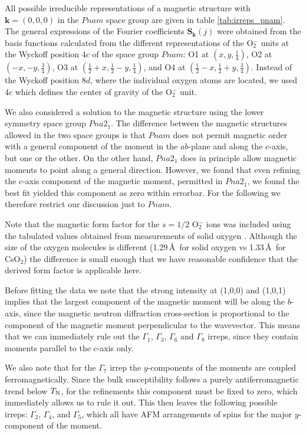 \documentclass[prb,aps,twocolumn,superscriptaddress,showpacs,footinbib]{revtex4-2}
\begin{document}
All possible irreducible representations of a magnetic structure with $\mathbf{k}=(0,0,0)$ in the $Pnam$ space group are given in table \ref{tab:irreps_pnam}. The general expressions of the Fourier coefficients $\mathbf{S_{k}}(j)$ were obtained from the basis functions calculated from the different representations of the O$_{2}^{-}$ units at the Wyckoff position $4c$ of the space group $Pnam$: O1 at $(x,y,\frac{1}{4})$, O2 at $(-x,-y,\frac{3}{4})$, O3 at $(\frac{1}{2}+x,\frac{1}{2}-y,\frac{1}{4})$, and O4 at $(\frac{1}{2}-x,\frac{1}{2}+y,\frac{3}{4})$. Instead of the Wyckoff position $8d$, where the individual oxygen atoms are located, we used $4c$ which defines the center of gravity of the O$_{2}^{-}$ unit.

We also considered a solution to the magnetic structure using the lower symmetry space group $Pna2_{1}$. The difference between the magnetic structures allowed in the two space groups is that $Pnam$ does not permit magnetic order with a general component of the moment in the $ab$-plane and along the $c$-axis, but one or the other. On the other hand, $Pna2_{1}$ does in principle allow magnetic moments to point along a general direction. However, we found that even refining the $c$-axis component of the magnetic moment, permitted in $Pna2_{1}$, we found the best fit yielded this component as zero within errorbar. For the following we therefore restrict our discussion just to $Pnam$.

Note that the magnetic form factor for the $s=1/2$ O$_{2}^{-}$ ions was included using the tabulated values obtained from measurements of solid oxygen \cite{Stephens_FF}. Although the size of the oxygen molecules is different (1.29\,\AA\, for solid oxygen vs 1.33\,\AA\, for CsO$_{2}$) the difference is small enough that we have reasonable confidence that the derived form factor is applicable here.

Before fitting the data we note that the strong intensity at (1,0,0) and (1,0,1) implies that the largest component of the magnetic moment will be along the $b$-axis, since the magnetic neutron diffraction cross-section is proportional to the component of the magnetic moment perpendicular to the wavevector. This means that we can immediately rule out the $\Gamma_{1}$, $\Gamma_{3}$, $\Gamma_{6}$ and $\Gamma_{8}$ irreps, since they contain moments parallel to the $c$-axis only.

We also note that for the $\Gamma_{7}$ irrep the $y$-components of the moments are coupled ferromagnetically. Since the bulk susceptibility follows a purely antiferromagnetic trend below $T_{\rm{N}}$, for the refinements this component must be fixed to zero, which immediately allows us to rule it out. This then leaves the following possible irreps: $\Gamma_{2}$, $\Gamma_{4}$, and $\Gamma_{5}$, which all have AFM arrangements of spins for the major $y$-component of the moment.
\end{document}
